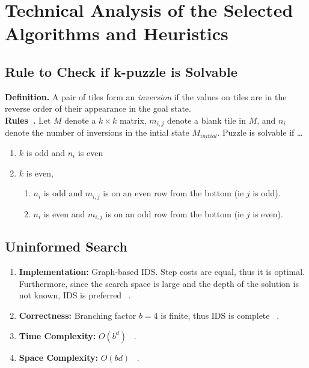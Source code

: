\documentclass[runningheads]{llncs}
\begin{document}
\section{Technical Analysis of the Selected Algorithms and Heuristics}

\subsection{Rule to Check if k-puzzle is Solvable}
\textbf{Definition.} A pair of tiles form an \textit{inversion} if the values on tiles are in the reverse order of their appearance in the goal state. \\
\textbf{Rules~\cite{aditya_goel_how_nodate}.} Let \( M \) denote a \( k \times k \) matrix, \( m_{i, j} \) denote a blank tile in \( M \), and \( n_i \) denote the number of inversions in the intial state \( M_{initial} \). Puzzle is solvable if \dots
\begin{enumerate}
    \item \( k \) is odd and \( n_i \) is even
    \item \( k \) is even,
    \begin{enumerate}
        \item \( n_i \) is odd and \( m_{i,j} \) is on an even row from the bottom (ie \( j \) is odd).
        \item \( n_i \) is even and \( m_{i,j} \) is on an odd row from the bottom (ie \( j \) is even).
    \end{enumerate}
\end{enumerate}

\subsection{Uninformed Search}
\begin{enumerate}
    \item \textbf{Implementation:} Graph-based IDS. Step costs are equal, thus it is optimal. Furthermore, since the search space is large and the depth of the solution is not known, IDS is preferred ~\cite[p90]{stuart_russell_artifical_2010}.
    \item \textbf{Correctness:} Branching factor \( b = 4 \) is finite, thus IDS is complete ~\cite[p88-90]{stuart_russell_artifical_2010}. 
    \item \textbf{Time Complexity:} \( O(b^d) \) ~\cite[p88-90]{stuart_russell_artifical_2010}.
    \item \textbf{Space Complexity:} \( O(bd) \) ~\cite[p88-90]{stuart_russell_artifical_2010}.
\end{enumerate}
\end{document}
